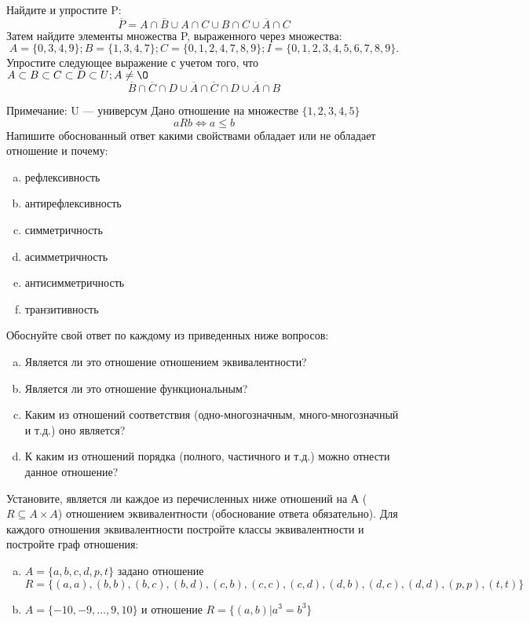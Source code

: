\documentclass[10pt]{exam}
\begin{document}
\begin{questions}
\question
Найдите и упростите P:
\begin{equation*}
\overline{P} = A \cap \overline{B} \cup A \cap C \cup B \cap C \cup \overline{A} \cap C
\end{equation*}
Затем найдите элементы множества P, выраженного через множества:
\begin{equation*}
A = \{0, 3, 4, 9\}; 
B = \{1, 3, 4, 7\};
C = \{0, 1, 2, 4, 7, 8, 9\};
I = \{0, 1, 2, 3, 4, 5, 6, 7, 8, 9\}.
\end{equation*}\question
Упростите следующее выражение с учетом того, что $A\subset B \subset C \subset D \subset U; A \neq \O$
\begin{equation*}
\overline{B} \cap \overline{C} \cap D \cup \overline{A} \cap \overline{C} \cap D \cup \overline{A} \cap B
\end{equation*}

Примечание: U — универсум\question
Дано отношение на множестве $\{1, 2, 3, 4, 5\}$ 
\begin{equation*}
aRb \iff a \leq b
\end{equation*}
Напишите обоснованный ответ какими свойствами обладает или не обладает отношение и почему:   
\begin{enumerate} [a)]\setcounter{enumi}{0}
\item рефлексивность
\item антирефлексивность
\item симметричность
\item асимметричность
\item антисимметричность
\item транзитивность
\end{enumerate}

Обоснуйте свой ответ по каждому из приведенных ниже вопросов:
\begin{enumerate} [a)]\setcounter{enumi}{0}
    \item Является ли это отношение отношением эквивалентности?
    \item Является ли это отношение функциональным?
    \item Каким из отношений соответствия (одно-многозначным, много-многозначный и т.д.) оно является?
    \item К каким из отношений порядка (полного, частичного и т.д.) можно отнести данное отношение?
\end{enumerate}


\question
Установите, является ли каждое из перечисленных ниже отношений на А ($R \subseteq A \times A$) отношением эквивалентности (обоснование ответа обязательно). Для каждого отношения эквивалентности постройте классы 
эквивалентности и постройте граф отношения:
\begin{enumerate} [a)]\setcounter{enumi}{0}
\item $A = \{a, b, c, d, p, t\}$ задано отношение $R = \{(a, a), (b, b), (b, c), (b, d), (c, b), (c, c), (c, d), (d, b), (d, c), (d, d), (p,p), (t,t)\}$
\item $A = \{-10, -9, … , 9, 10\}$ и отношение $R = \{(a,b)|a^{3} = b^{3}\}$


\end{enumerate}
\end{questions}
\end{document}
